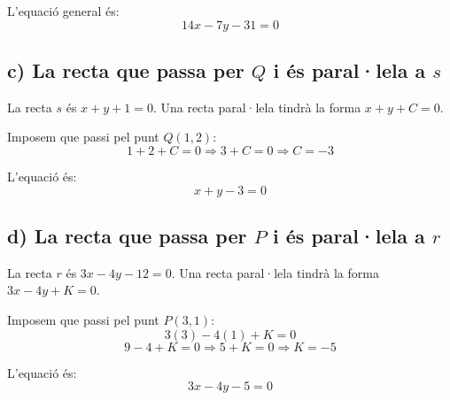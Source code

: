 \documentclass[12pt,a4paper]{article}
\begin{document}
L'equació general és:
\[ \boxed{14x - 7y - 31 = 0} \]

\begin{center}
\end{center}

\newpage

\subsection*{c) La recta que passa per $Q$ i és paral·lela a $s$}

La recta $s$ és $x + y + 1 = 0$.
Una recta paral·lela tindrà la forma $x + y + C = 0$.

Imposem que passi pel punt $Q(1, 2)$:
\[ 1 + 2 + C = 0 \Rightarrow 3 + C = 0 \Rightarrow C = -3 \]

L'equació és:
\[ \boxed{x + y - 3 = 0} \]

\subsection*{d) La recta que passa per $P$ i és paral·lela a $r$}

La recta $r$ és $3x - 4y - 12 = 0$.
Una recta paral·lela tindrà la forma $3x - 4y + K = 0$.

Imposem que passi pel punt $P(3, 1)$:
\[ 3(3) - 4(1) + K = 0 \]
\[ 9 - 4 + K = 0 \Rightarrow 5 + K = 0 \Rightarrow K = -5 \]

L'equació és:
\[ \boxed{3x - 4y - 5 = 0} \]
\end{document}
